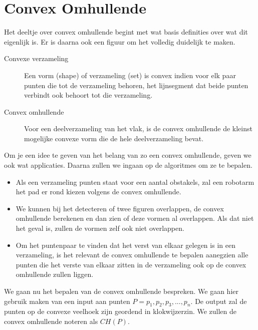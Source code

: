 \documentclass[12pt,a4paper]{article}
\begin{document}
	\section{Convex Omhullende}
	Het deeltje over convex omhullende begint met wat basis definities over wat dit eigenlijk is. Er is daarna ook een figuur om het volledig duidelijk te maken. 
		\begin{description}
			\item[Convexe verzameling] Een vorm (shape) of verzameling (set) is convex indien voor elk paar punten die tot de verzameling behoren, het lijnsegment dat beide punten verbindt ook behoort tot die verzameling. 
			\item[Convex omhullende] Voor een deelverzameling van het vlak, is de convex omhullende de kleinst mogelijke convexe vorm die de hele deelverzameling bevat. 
		\end{description}
	Om je een idee te geven van het belang van zo een convex omhullende, geven we ook wat applicaties. Daarna zullen we ingaan op de algoritmes om ze te bepalen. 
		\begin{itemize}
			\item Als een verzameling punten staat voor een aantal obstakels, zal een robotarm het pad 	er rond kiezen volgens de convex omhullende. 
			\item We kunnen bij het detecteren of twee figuren overlappen, de convex omhullende berekenen en dan zien of deze vormen al overlappen. Als dat niet het geval is, zullen de vormen zelf ook niet overlappen. 
			\item Om het puntenpaar te vinden dat het verst van elkaar gelegen is in een verzameling, is het relevant de convex omhullende te bepalen aanegzien alle punten die het verste van elkaar zitten in de verzameling ook op de convex omhullende zullen liggen. 
		\end{itemize}
	We gaan nu het bepalen van de convex omhullende bespreken. We gaan hier gebruik maken van een input aan punten \(P = {p_1, p_2, p_3, ..., p_n}\). De output zal de punten op de convexe veelhoek zijn geordend in klokwijzerzin. We zullen de convex omhullende noteren als $CH(P)$.
	
	
\end{document}
